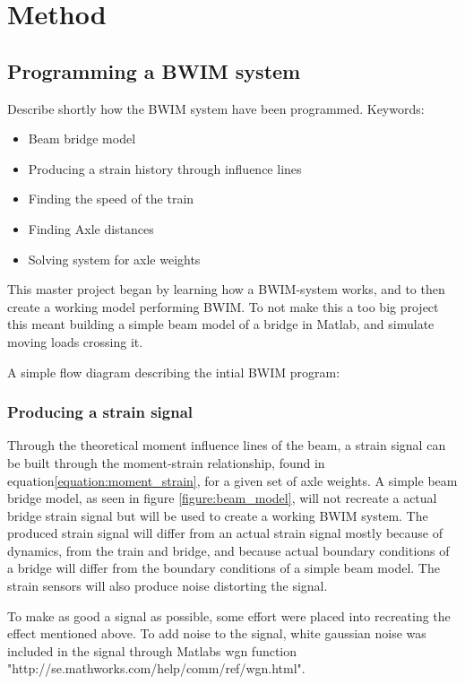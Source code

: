 \section{Method}

\subsection{Programming a BWIM system}
Describe shortly how the BWIM system have been programmed.
Keywords:
\begin{itemize}
\item Beam bridge model
\item Producing a strain history through influence lines
\item Finding the speed of the train
\item Finding Axle distances
\item Solving system for axle weights
\end{itemize}
This master project began by learning how a BWIM-system works, and to then create a working model performing BWIM. To not make this a too big project this meant building a simple beam model of a bridge in Matlab, and simulate moving loads crossing it.

A simple flow diagram describing the intial BWIM program:
\begin{figure}[H]
	\centering
	
\end{figure}


\subsubsection{Producing a strain signal}
Through the theoretical moment influence lines of the beam, a strain signal can be built through the moment-strain relationship, found in equation\ref{equation:moment_strain}, for a given set of axle weights. A simple beam bridge model, as seen in figure \ref{figure:beam_model}, will not recreate a actual bridge strain signal but will be used to create a working BWIM system. The produced strain signal will differ from an actual strain signal mostly because of dynamics, from the train and bridge, and because actual boundary conditions of a bridge will differ from the boundary conditions of a simple beam model. The strain sensors will also produce noise distorting the signal.

To make as good a signal as possible, some effort were placed into recreating the effect mentioned above. To add noise to the signal, white gaussian noise was included in the signal through Matlabs wgn function "http://se.mathworks.com/help/comm/ref/wgn.html".


